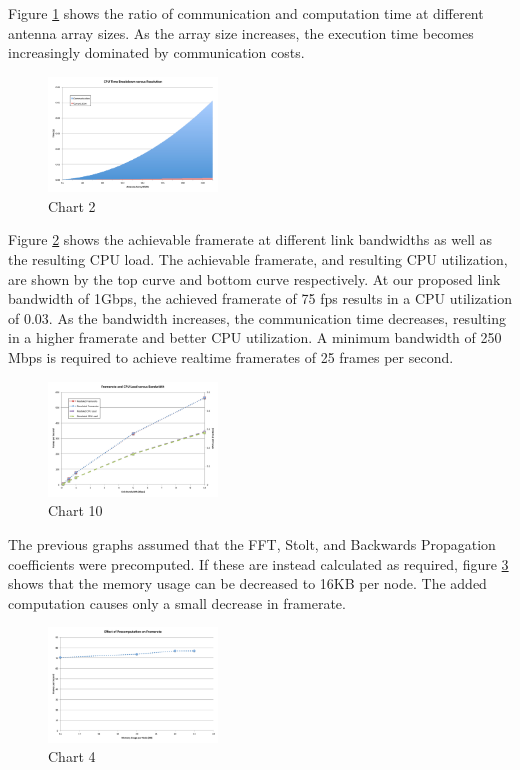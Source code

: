 \documentclass[twocolumn]{article}
\begin{document}
Figure \ref{cpu breakdown vs resolution} shows the ratio of communication and computation time at different antenna array sizes. As the array size increases, the execution time becomes increasingly dominated by communication costs.

\begin{figure}[!h]
\centering
\includegraphics*[width=0.4\textwidth]{figures/chart2.pdf}
\caption{Chart 2}
\label{cpu breakdown vs resolution}
\end{figure}

Figure \ref{framerate vs bandwidth} shows the achievable framerate at different link bandwidths as well as the resulting CPU load. The achievable framerate, and resulting CPU utilization, are shown by the top curve and bottom curve respectively. At our proposed link bandwidth of 1Gbps, the achieved framerate of 75 fps results in a CPU utilization of 0.03. As the bandwidth increases, the communication time decreases, resulting in a higher framerate and better CPU utilization. A minimum bandwidth of 250 Mbps is required to achieve realtime framerates of 25 frames per second.

\begin{figure}[!h]
\centering
\includegraphics*[width=0.4\textwidth]{figures/chart10.pdf}
\caption{Chart 10}
\label{framerate vs bandwidth}
\end{figure}

The previous graphs assumed that the FFT, Stolt, and Backwards Propagation coefficients were precomputed. If these are instead calculated as required, figure \ref{precomputation} shows that the memory usage can be decreased to 16KB per node. The added computation causes only a small decrease in framerate.

\begin{figure}[!h]
\centering
\includegraphics*[width=0.4\textwidth]{figures/chart4.pdf}
\caption{Chart 4}
\label{precomputation}
\end{figure}
\end{document}

